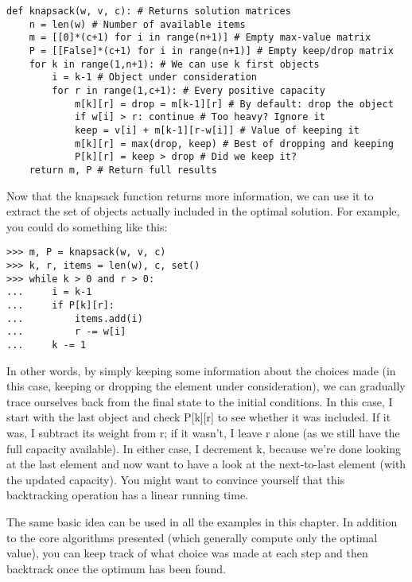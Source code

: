\begin{lstlisting}[caption={An Iterative Solution to the 0-1 Knapsack Problem}]
def knapsack(w, v, c): # Returns solution matrices
    n = len(w) # Number of available items
    m = [[0]*(c+1) for i in range(n+1)] # Empty max-value matrix
    P = [[False]*(c+1) for i in range(n+1)] # Empty keep/drop matrix
    for k in range(1,n+1): # We can use k first objects
        i = k-1 # Object under consideration
        for r in range(1,c+1): # Every positive capacity
            m[k][r] = drop = m[k-1][r] # By default: drop the object
            if w[i] > r: continue # Too heavy? Ignore it
            keep = v[i] + m[k-1][r-w[i]] # Value of keeping it
            m[k][r] = max(drop, keep) # Best of dropping and keeping
            P[k][r] = keep > drop # Did we keep it?
    return m, P # Return full results
\end{lstlisting}

Now that the knapsack function returns more information, we can use it to extract the set of objects actually included in the optimal solution. For example, you could do something like this:
\begin{lstlisting}
>>> m, P = knapsack(w, v, c)
>>> k, r, items = len(w), c, set()
>>> while k > 0 and r > 0:
...     i = k-1
...     if P[k][r]:
...         items.add(i)
...         r -= w[i]
...     k -= 1
\end{lstlisting}

In other words, by simply keeping some information about the choices made (in this case, keeping
or dropping the element under consideration), we can gradually trace ourselves back from the final state to the initial conditions. In this case, I start with the last object and check P[k][r] to see whether it was included. If it was, I subtract its weight from r; if it wasn't, I leave r alone (as we still have the full capacity available). In either case, I decrement k, because we're done looking at the last element and now want to have a look at the next-to-last element (with the updated capacity). You might want to convince yourself that this backtracking operation has a linear running time.

The same basic idea can be used in all the examples in this chapter. In addition to the core
algorithms presented (which generally compute only the optimal value), you can keep track of what
choice was made at each step and then backtrack once the optimum has been found.


